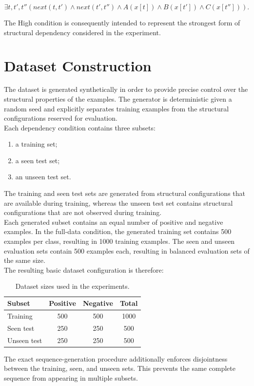 $$
\exists t,t',t''
\left(
next(t,t')
\land
next(t',t'')
\land
A(x[t])
\land
B(x[t'])
\land
C(x[t''])
\right).
$$

\noindent
The High condition is consequently intended to represent the strongest form of structural dependency considered in the experiment.

\section{Dataset Construction}

\noindent
The dataset is generated synthetically in order to provide precise control over the structural properties of the examples. The generator is deterministic given a random seed and explicitly separates training examples from the structural configurations reserved for evaluation.
\\
Each dependency condition contains three subsets:

\begin{enumerate}
\item a training set;
\item a seen test set;
\item an unseen test set.
\end{enumerate}

\noindent
The training and seen test sets are generated from structural configurations that are available during training, whereas the unseen test set contains structural configurations that are not observed during training.
\\
Each generated subset contains an equal number of positive and negative examples. In the full-data condition, the generated training set contains 500 examples per class, resulting in 1000 training examples. The seen and unseen evaluation sets contain 500 examples each, resulting in balanced evaluation sets of the same size.
\\
The resulting basic dataset configuration is therefore:

\begin{table}[ht]
\centering
\caption{Dataset sizes used in the experiments.}
\label{tab:dataset_sizes}
\begin{tabular}{lccc}
\hline
Subset & Positive & Negative & Total \\
\hline
Training & 500 & 500 & 1000 \\
Seen test & 250 & 250 & 500 \\
Unseen test & 250 & 250 & 500 \\
\hline
\end{tabular}
\end{table}
\noindent
The exact sequence-generation procedure additionally enforces disjointness between the training, seen, and unseen sets. This prevents the same complete sequence from appearing in multiple subsets.

